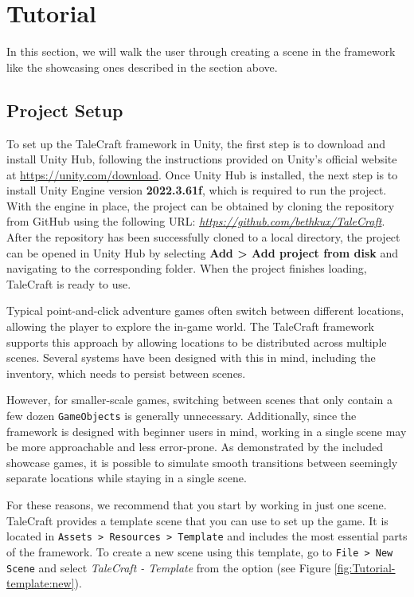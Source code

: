 \section{Tutorial}
In this section, we will walk the user through creating a scene in the framework like the showcasing ones described in the section above. 

\subsection{Project Setup}
To set up the TaleCraft framework in Unity, the first step is to download and install Unity Hub, following the instructions provided on Unity’s official website at \href{https://unity.com/download}{https://unity.com/download}. Once Unity Hub is installed, the next step is to install Unity Engine version \textbf{2022.3.61f}, which is required to run the project. With the engine in place, the project can be obtained by cloning the repository from GitHub using the following URL: \href{https://github.com/bethkux/TaleCraft}{\textit{https://github.com/bethkux/TaleCraft}}. After the repository has been successfully cloned to a local directory, the project can be opened in Unity Hub by selecting \textbf{Add > Add project from disk} and navigating to the corresponding folder. When the project finishes loading, TaleCraft is ready to use.

Typical point-and-click adventure games often switch between different locations, allowing the player to explore the in-game world. The TaleCraft framework supports this approach by allowing locations to be distributed across multiple scenes. Several systems have been designed with this in mind, including the inventory, which needs to persist between scenes. 

However, for smaller-scale games, switching between scenes that only contain a few dozen \texttt{GameObjects} is generally unnecessary. Additionally, since the framework is designed with beginner users in mind, working in a single scene may be more approachable and less error-prone. As demonstrated by the included showcase games, it is possible to simulate smooth transitions between seemingly separate locations while staying in a single scene.

For these reasons, we recommend that you start by working in just one scene. TaleCraft provides a template scene that you can use to set up the game. It is located in \texttt{Assets > Resources > Template} and includes the most essential parts of the framework. To create a new scene using this template, go to \texttt{File > New Scene} and select \textit{TaleCraft - Template} from the option (see Figure \ref{fig:Tutorial-template:new}). 


